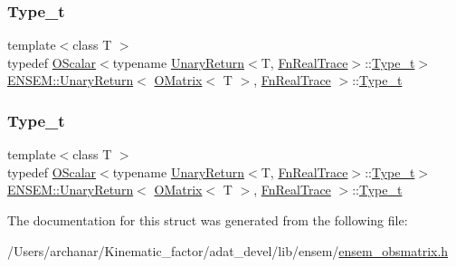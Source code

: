 \subsubsection{\texorpdfstring{Type\_t}{Type\_t}\hspace{0.1cm}{\footnotesize\ttfamily [1/2]}}
{\footnotesize\ttfamily template$<$class T $>$ \\
typedef \mbox{\hyperlink{classENSEM_1_1OScalar}{O\+Scalar}}$<$typename \mbox{\hyperlink{structENSEM_1_1UnaryReturn}{Unary\+Return}}$<$T, \mbox{\hyperlink{structENSEM_1_1FnRealTrace}{Fn\+Real\+Trace}}$>$\+::\mbox{\hyperlink{structENSEM_1_1UnaryReturn_3_01OMatrix_3_01T_01_4_00_01FnRealTrace_01_4_aaaa039ed6375a6c096ce155e79a2c9cd}{Type\+\_\+t}}$>$ \mbox{\hyperlink{structENSEM_1_1UnaryReturn}{E\+N\+S\+E\+M\+::\+Unary\+Return}}$<$ \mbox{\hyperlink{classENSEM_1_1OMatrix}{O\+Matrix}}$<$ T $>$, \mbox{\hyperlink{structENSEM_1_1FnRealTrace}{Fn\+Real\+Trace}} $>$\+::\mbox{\hyperlink{structENSEM_1_1UnaryReturn_3_01OMatrix_3_01T_01_4_00_01FnRealTrace_01_4_aaaa039ed6375a6c096ce155e79a2c9cd}{Type\+\_\+t}}}

\mbox{\label{structENSEM_1_1UnaryReturn_3_01OMatrix_3_01T_01_4_00_01FnRealTrace_01_4_aaaa039ed6375a6c096ce155e79a2c9cd}} 
\subsubsection{\texorpdfstring{Type\_t}{Type\_t}\hspace{0.1cm}{\footnotesize\ttfamily [2/2]}}
{\footnotesize\ttfamily template$<$class T $>$ \\
typedef \mbox{\hyperlink{classENSEM_1_1OScalar}{O\+Scalar}}$<$typename \mbox{\hyperlink{structENSEM_1_1UnaryReturn}{Unary\+Return}}$<$T, \mbox{\hyperlink{structENSEM_1_1FnRealTrace}{Fn\+Real\+Trace}}$>$\+::\mbox{\hyperlink{structENSEM_1_1UnaryReturn_3_01OMatrix_3_01T_01_4_00_01FnRealTrace_01_4_aaaa039ed6375a6c096ce155e79a2c9cd}{Type\+\_\+t}}$>$ \mbox{\hyperlink{structENSEM_1_1UnaryReturn}{E\+N\+S\+E\+M\+::\+Unary\+Return}}$<$ \mbox{\hyperlink{classENSEM_1_1OMatrix}{O\+Matrix}}$<$ T $>$, \mbox{\hyperlink{structENSEM_1_1FnRealTrace}{Fn\+Real\+Trace}} $>$\+::\mbox{\hyperlink{structENSEM_1_1UnaryReturn_3_01OMatrix_3_01T_01_4_00_01FnRealTrace_01_4_aaaa039ed6375a6c096ce155e79a2c9cd}{Type\+\_\+t}}}



The documentation for this struct was generated from the following file\+:\begin{DoxyCompactItemize}
\item 
/\+Users/archanar/\+Kinematic\+\_\+factor/adat\+\_\+devel/lib/ensem/\mbox{\hyperlink{lib_2ensem_2ensem__obsmatrix_8h}{ensem\+\_\+obsmatrix.\+h}}\end{DoxyCompactItemize}

